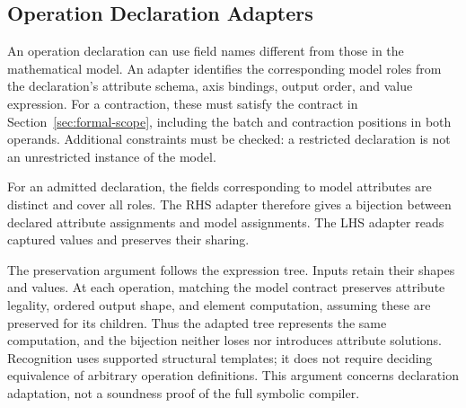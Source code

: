 \subsection{Operation Declaration Adapters}
\label{sec:declaration-adapters}
An operation declaration can use field names different from those in the
mathematical model. An adapter identifies the corresponding model roles
from the declaration's attribute schema, axis bindings, output order, and
value expression. For a contraction, these must satisfy the contract in
Section~\ref{sec:formal-scope}, including the batch and contraction
positions in both operands. Additional constraints must be checked: a
restricted declaration is not an unrestricted instance of the model.

For an admitted declaration, the fields corresponding to model attributes
are distinct and cover all roles. The RHS adapter therefore gives a
bijection between declared attribute assignments and model assignments.
The LHS adapter reads captured values and preserves their sharing.

The preservation argument follows the expression tree. Inputs retain their
shapes and values. At each operation, matching the model contract preserves
attribute legality, ordered output shape, and element computation, assuming
these are preserved for its children. Thus the adapted tree represents the
same computation, and the bijection neither loses nor introduces attribute
solutions. Recognition uses supported structural templates; it does not
require deciding equivalence of arbitrary operation definitions. This
argument concerns declaration adaptation, not a soundness proof of the
full symbolic compiler.
